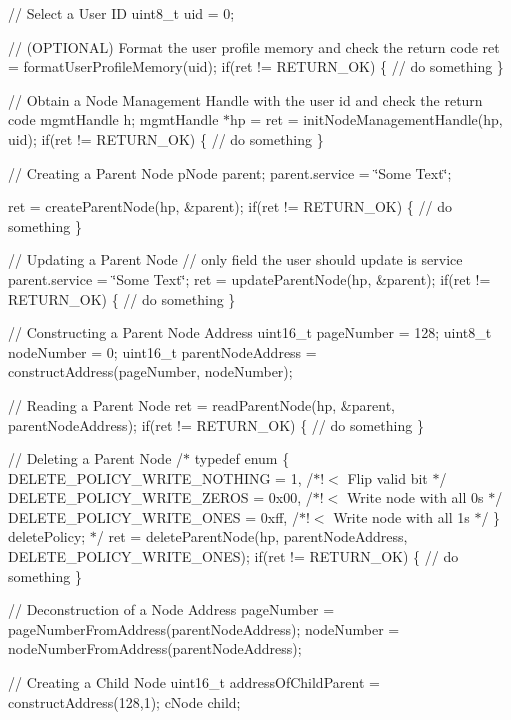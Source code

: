 // Select a User ID uint8\+\_\+t uid = 0;

// (O\+P\+T\+I\+O\+N\+AL) Format the user profile memory and check the return code ret = format\+User\+Profile\+Memory(uid); if(ret != R\+E\+T\+U\+R\+N\+\_\+\+OK) \{ // do something \}

// Obtain a Node Management Handle with the user id and check the return code mgmt\+Handle h; mgmt\+Handle $\ast$hp =  ret = init\+Node\+Management\+Handle(hp, uid); if(ret != R\+E\+T\+U\+R\+N\+\_\+\+OK) \{ // do something \}

// Creating a Parent Node p\+Node parent; parent.\+service = \char`\"{}\+Some Text\char`\"{};

ret = create\+Parent\+Node(hp, \&parent); if(ret != R\+E\+T\+U\+R\+N\+\_\+\+OK) \{ // do something \}

// Updating a Parent Node // only field the user should update is service parent.\+service = \char`\"{}\+Some Text\char`\"{}; ret = update\+Parent\+Node(hp, \&parent); if(ret != R\+E\+T\+U\+R\+N\+\_\+\+OK) \{ // do something \}

// Constructing a Parent Node Address uint16\+\_\+t page\+Number = 128; uint8\+\_\+t node\+Number = 0; uint16\+\_\+t parent\+Node\+Address = construct\+Address(page\+Number, node\+Number);

// Reading a Parent Node ret = read\+Parent\+Node(hp, \&parent, parent\+Node\+Address); if(ret != R\+E\+T\+U\+R\+N\+\_\+\+OK) \{ // do something \}

// Deleting a Parent Node /$\ast$ typedef enum \{ D\+E\+L\+E\+T\+E\+\_\+\+P\+O\+L\+I\+C\+Y\+\_\+\+W\+R\+I\+T\+E\+\_\+\+N\+O\+T\+H\+I\+NG = 1, /$\ast$!$<$ Flip valid bit $\ast$/ D\+E\+L\+E\+T\+E\+\_\+\+P\+O\+L\+I\+C\+Y\+\_\+\+W\+R\+I\+T\+E\+\_\+\+Z\+E\+R\+OS = 0x00, /$\ast$!$<$ Write node with all 0\textquotesingle{}s $\ast$/ D\+E\+L\+E\+T\+E\+\_\+\+P\+O\+L\+I\+C\+Y\+\_\+\+W\+R\+I\+T\+E\+\_\+\+O\+N\+ES = 0xff, /$\ast$!$<$ Write node with all 1\textquotesingle{}s $\ast$/ \} delete\+Policy; $\ast$/ ret = delete\+Parent\+Node(hp, parent\+Node\+Address, D\+E\+L\+E\+T\+E\+\_\+\+P\+O\+L\+I\+C\+Y\+\_\+\+W\+R\+I\+T\+E\+\_\+\+O\+N\+E\+S); if(ret != R\+E\+T\+U\+R\+N\+\_\+\+OK) \{ // do something \}

// Deconstruction of a Node Address page\+Number = page\+Number\+From\+Address(parent\+Node\+Address); node\+Number = node\+Number\+From\+Address(parent\+Node\+Address);

// Creating a Child Node uint16\+\_\+t address\+Of\+Child\+Parent = construct\+Address(128,1); c\+Node child;

